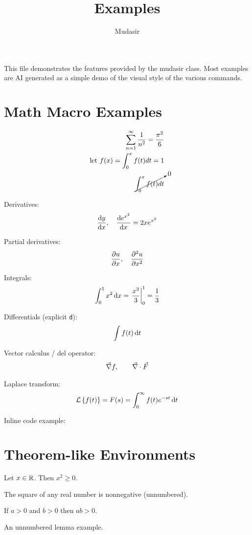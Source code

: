 \documentclass{mudasir}
\date{}
\author{Mudasir}
\begin{document}
\title{Examples}
\maketitle

This file demonstrates the features provided by the mudasir class. Most examples are AI generated as a simple demo of the visual style of the various commands.

\section*{Math Macro Examples}
\begin{align*}
    \sum_{n=1}^\infty \frac{1}{n^2} = \frac{\pi^2}{6} \\
    \text{let }f(x) = \int_0^x f(t) dt = 1 \\
    \cancelto{0}{\int_0^x f(t) dt}
\end{align*}

Derivatives:
\[
    \frac{\mathrm{d}{y}}{\mathrm{d}{x}},\quad \frac{\mathrm{d}{e^{x^2}}}{\mathrm{d}{x}}=2x e^{x^2}
\]

Partial derivatives:
\[
    \frac{\partial{u}}{\partial{x}},\quad \frac{\partial{^2 u}}{\partial{x^2}}
\]

Integrals:
\[
    \displaystyle\int_{0}^{1}{x^2}\,\mathrm{d}{x} = \left.\frac{x^3}{3}\right|_0^1 = \frac{1}{3}
\]

Differentials (explicit \verb|d|):
\[
    \int f(t)\,\mathrm{d}{t}
\]

Vector calculus / del operator:
\[
    \vec{\nabla} f,\qquad \vec{\nabla}\cdot \vec{F}
\]

Laplace transform:
\[
    \mathcal{L}\left\{f(t)\right\} = F(s) = \int_0^{\infty} f(t)e^{-st}\,\mathrm{d}{t}
\]

Inline code example: 

\section*{Theorem-like Environments}
\begin{theorem}
Let $x\in\mathbb R$. Then $x^2\ge0$.
\end{theorem}

\begin{theorem*}
The square of any real number is nonnegative (unnumbered).
\end{theorem*}

\begin{lemma}
If $a>0$ and $b>0$ then $ab>0$.
\end{lemma}

\begin{lemma*}
An unnumbered lemma example.
\end{lemma*}
\end{document}
